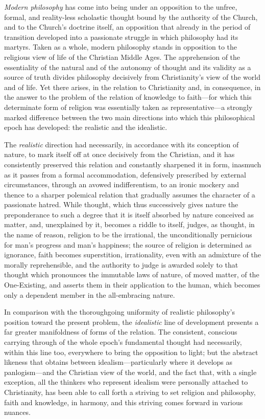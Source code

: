 \documentclass[12pt,a4paper]{book}
\begin{document}
\emph{Modern philosophy} has come into being under an opposition to the unfree,
formal, and reality-less scholastic thought bound by the authority of the
Church, and to the Church's doctrine itself, an opposition that already in the
period of transition developed into a passionate struggle in which philosophy
had its martyrs. Taken as a whole, modern philosophy stands in opposition to
the religious view of life of the Christian Middle Ages. The apprehension of
the essentiality of the natural and of the autonomy of thought and its
validity as a source of truth divides philosophy decisively from
Christianity's view of the world and of life. Yet there arises, in the
relation to Christianity and, in consequence, in the answer to the problem of
the relation of knowledge to faith---for which this determinate form of
religion was essentially taken as representative---a strongly marked
difference between the two main directions into which this philosophical epoch
has developed: the realistic and the idealistic.

The \emph{realistic} direction had necessarily, in accordance with its conception of
nature, to mark itself off at once decisively from the Christian, and it has
consistently preserved this relation and constantly sharpened it in form,
inasmuch as it passes from a formal accommodation, defensively prescribed by
external circumstances, through an avowed indifferentism, to an ironic mockery
and thence to a sharper polemical relation that gradually assumes the
character of a passionate hatred. While thought, which thus successively gives
nature the preponderance to such a degree that it is itself absorbed by nature
conceived as matter, and, unexplained by it, becomes a riddle to itself,
judges, as thought, in the name of reason, religion to be the irrational, the
unconditionally pernicious for man's progress and man's happiness; the source
of religion is determined as ignorance, faith becomes superstition,
irrationality, even with an admixture of the morally reprehensible, and the
authority to judge is awarded solely to that thought which pronounces the
immutable laws of nature, of moved matter, of the One-Existing, and asserts
them in their application to the human, which becomes only a dependent member
in the all-embracing nature.

In comparison with the thoroughgoing uniformity of realistic philosophy's
position toward the present problem, the \emph{idealistic} line of development
presents a far greater manifoldness of forms of the relation. The consistent,
conscious carrying through of the whole epoch's fundamental thought had
necessarily, within this line too, everywhere to bring the opposition to
light; but the abstract likeness that obtains between idealism---particularly
where it develops as panlogism---and the Christian view of the world, and the
fact that, with a single exception, all the thinkers who represent idealism
were personally attached to Christianity, has been able to call forth a
striving to set religion and philosophy, faith and knowledge, in harmony, and
this striving comes forward in various nuances.
\end{document}
